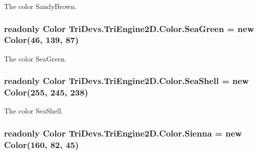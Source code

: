 The color Sandy\-Brown. 

\hypertarget{struct_tri_devs_1_1_tri_engine2_d_1_1_color_abd4d46ec3d7c34147f8eea9d6b4d730b}{
\subsubsection[{Sea\-Green}]{\setlength{\rightskip}{0pt plus 5cm}readonly {\bf Color} Tri\-Devs.\-Tri\-Engine2\-D.\-Color.\-Sea\-Green = new {\bf Color}(46, 139, 87)\hspace{0.3cm}{\ttfamily [static]}}}\label{struct_tri_devs_1_1_tri_engine2_d_1_1_color_abd4d46ec3d7c34147f8eea9d6b4d730b}


The color Sea\-Green. 

\hypertarget{struct_tri_devs_1_1_tri_engine2_d_1_1_color_a66e453bd0453e666d704d6287babdaaf}{
\subsubsection[{Sea\-Shell}]{\setlength{\rightskip}{0pt plus 5cm}readonly {\bf Color} Tri\-Devs.\-Tri\-Engine2\-D.\-Color.\-Sea\-Shell = new {\bf Color}(255, 245, 238)\hspace{0.3cm}{\ttfamily [static]}}}\label{struct_tri_devs_1_1_tri_engine2_d_1_1_color_a66e453bd0453e666d704d6287babdaaf}


The color Sea\-Shell. 

\hypertarget{struct_tri_devs_1_1_tri_engine2_d_1_1_color_a1a0e4c9ae6d838505bcd78aee6244722}{
\subsubsection[{Sienna}]{\setlength{\rightskip}{0pt plus 5cm}readonly {\bf Color} Tri\-Devs.\-Tri\-Engine2\-D.\-Color.\-Sienna = new {\bf Color}(160, 82, 45)\hspace{0.3cm}{\ttfamily [static]}}}\label{struct_tri_devs_1_1_tri_engine2_d_1_1_color_a1a0e4c9ae6d838505bcd78aee6244722}


